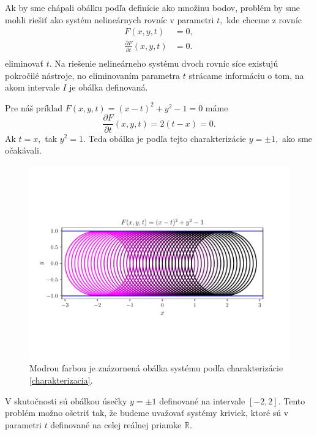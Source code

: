 Ak by sme chápali obálku podľa definície ako množinu bodov, problém by sme mohli riešiť ako systém nelineárnych rovníc v parametri $t,$ kde chceme z rovníc 
\begin{align*}
F(x,y,t) &= 0, \\
\frac{\partial F}{\partial t}(x, y, t) &= 0. \\
\end{align*}
eliminovať $t.$ Na riešenie nelineárneho systému dvoch rovníc síce existujú pokročilé nástroje, no eliminovaním parametra $t$ strácame informáciu o tom, na akom intervale $I$ je obálka definovaná. 

\begin{example}
Pre náš príklad $ F(x, y, t) = (x - t)^2 + y^2 - 1 = 0 $ máme 
$$\frac{\partial F}{\partial t}(x, y, t) = 2(t-x) = 0. $$
Ak $t = x, $ tak $y^2 = 1.$ Teda obálka je podľa tejto charakterizácie $ y = \pm 1, $ ako sme očakávali.
\end{example}

\begin{figure}[h]
	\centering
	\includegraphics[trim={0.5cm 2.8cm 0.5cm 3.3cm},clip]{images/system_with_envelope_unlimited_domain.pdf}
	\caption[Obálka systému podľa charakterizácie.]{Modrou farbou je znázornená obálka systému podľa charakterizácie \ref{charakterizacia}.}
	\label{fig:system_with_envelope_unlimited_domain}
\end{figure}

V skutočnosti sú obálkou úsečky $y=\pm 1$ definované na intervale $[-2,2]$. Tento problém možno ošetriť tak, že budeme uvažovať systémy kriviek, ktoré sú v parametri $t$ definované na celej reálnej priamke $\mathbb{R}$. 

